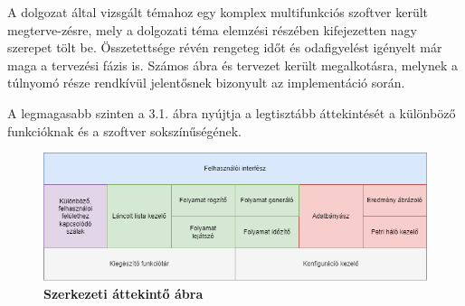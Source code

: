 
A dolgozat által vizsgált témahoz egy komplex multifunkciós szoftver került megterve\hyp{}zésre, mely a dolgozati téma elemzési részében kifejezetten nagy szerepet tölt be. Összetettsége révén rengeteg időt és odafigyelést igényelt már maga a tervezési fázis is. Számos ábra és tervezet került megalkotásra, melynek a túlnyomó része rendkívül jelentősnek bizonyult az implementáció során.


A legmagasabb szinten a 3.1. ábra nyújtja a legtisztább áttekintését a különböző funkcióknak és a szoftver sokszínűségének.

\begin{figure}[h!]
\begin{center}
\includegraphics[width=\textwidth,keepaspectratio=true]{images/img_plan_1}
\caption{\textbf{Szerkezeti áttekintő ábra}}
\label{fig:plan}
\end{center}
\end{figure}

